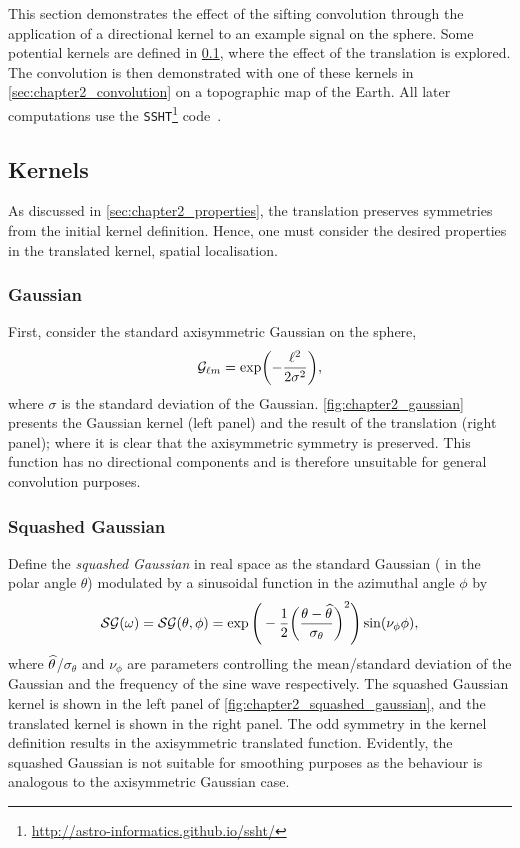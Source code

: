 This section demonstrates the effect of the sifting convolution through the application of a directional kernel to an example signal on the sphere.
Some potential kernels are defined in \cref{sec:chapter2_kernels}, where the effect of the translation is explored.
The convolution is then demonstrated with one of these kernels in \cref{sec:chapter2_convolution} on a topographic map of the Earth.
All later computations use the \texttt{SSHT}\footnote{\url{http://astro-informatics.github.io/ssht/}} code~\cite{McEwen2011}.

\subsection{Kernels}\label{sec:chapter2_kernels}

As discussed in \cref{sec:chapter2_properties}, the translation preserves symmetries from the initial kernel definition.
Hence, one must consider the desired properties in the translated kernel, \eg{} spatial localisation.

\subsubsection{Gaussian}

First, consider the standard axisymmetric Gaussian on the sphere, \ie{}
%
\begin{equation}
	{\mathcal{G}}_{\ell m}
	= \exp(-\frac{{\ell}^{2}}{2\sigma^{2}}),
\end{equation}
%
where \(\sigma{}\) is the standard deviation of the Gaussian.
\cref{fig:chapter2_gaussian} presents the Gaussian kernel (left panel) and the result of the translation (right panel); where it is clear that the axisymmetric symmetry is preserved.
This function has no directional components and is therefore unsuitable for general convolution purposes.



\subsubsection{Squashed Gaussian}

Define the \emph{squashed Gaussian} in real space as the standard Gaussian (\ie{} in the polar angle \(\theta{}\)) modulated by a sinusoidal function in the azimuthal angle \(\phi{}\) by
%
\begin{equation}
	\mathcal{SG}(\omega)
	= \mathcal{SG}(\theta,\phi)
	= \exp\Bigg(-\frac{1}{2}{\bigg(\frac{\theta-\widehat{\theta}}{\sigma_{\theta}}\bigg)}^{2}\Bigg)
	\sin(\nu_{\phi}\phi),
\end{equation}
%
where \(\widehat{\theta}\)/\(\sigma_{\theta}\) and \(\nu_{\phi}\) are parameters controlling the mean/standard deviation of the Gaussian and the frequency of the sine wave respectively.
The squashed Gaussian kernel is shown in the left panel of \cref{fig:chapter2_squashed_gaussian}, and the translated kernel is shown in the right panel.
The odd symmetry in the kernel definition results in the axisymmetric translated function.
Evidently, the squashed Gaussian is not suitable for smoothing purposes as the behaviour is analogous to the axisymmetric Gaussian case.

